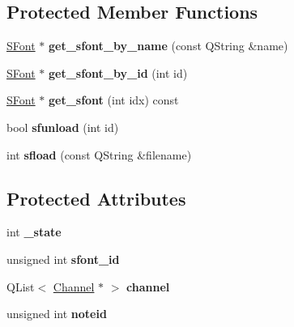 \subsection*{Protected Member Functions}
\begin{DoxyCompactItemize}
\item 
\mbox{\label{class_fluid_s_1_1_fluid_abda7a5006a78d683bc4fbe7a40d169cd}} 
\hyperlink{class_fluid_s_1_1_s_font}{S\+Font} $\ast$ {\bfseries get\+\_\+sfont\+\_\+by\+\_\+name} (const Q\+String \&name)
\item 
\mbox{\label{class_fluid_s_1_1_fluid_a044141b557f963cc4c94700f175d2fe1}} 
\hyperlink{class_fluid_s_1_1_s_font}{S\+Font} $\ast$ {\bfseries get\+\_\+sfont\+\_\+by\+\_\+id} (int id)
\item 
\mbox{\label{class_fluid_s_1_1_fluid_aaf6e3df6ceb39e89b3f688f8a85c6459}} 
\hyperlink{class_fluid_s_1_1_s_font}{S\+Font} $\ast$ {\bfseries get\+\_\+sfont} (int idx) const
\item 
\mbox{\label{class_fluid_s_1_1_fluid_a0c1621c7fe8e9b3c42417c298f8919bd}} 
bool {\bfseries sfunload} (int id)
\item 
\mbox{\label{class_fluid_s_1_1_fluid_a35fe3c7e3c3dc99329aee4897d6be066}} 
int {\bfseries sfload} (const Q\+String \&filename)
\end{DoxyCompactItemize}
\subsection*{Protected Attributes}
\begin{DoxyCompactItemize}
\item 
\mbox{\label{class_fluid_s_1_1_fluid_ad0a0413bb70c8920af1c0968580605a6}} 
int {\bfseries \+\_\+state}
\item 
\mbox{\label{class_fluid_s_1_1_fluid_a7db34eab79b341894fd53177e875064e}} 
unsigned int {\bfseries sfont\+\_\+id}
\item 
\mbox{\label{class_fluid_s_1_1_fluid_af6ac15dd00684c6aa134fac65abd0b46}} 
Q\+List$<$ \hyperlink{class_fluid_s_1_1_channel}{Channel} $\ast$ $>$ {\bfseries channel}
\item 
\mbox{\label{class_fluid_s_1_1_fluid_abc81ab0f5f679d18d80605eb02b63a57}} 
unsigned int {\bfseries noteid}
\end{DoxyCompactItemize}
